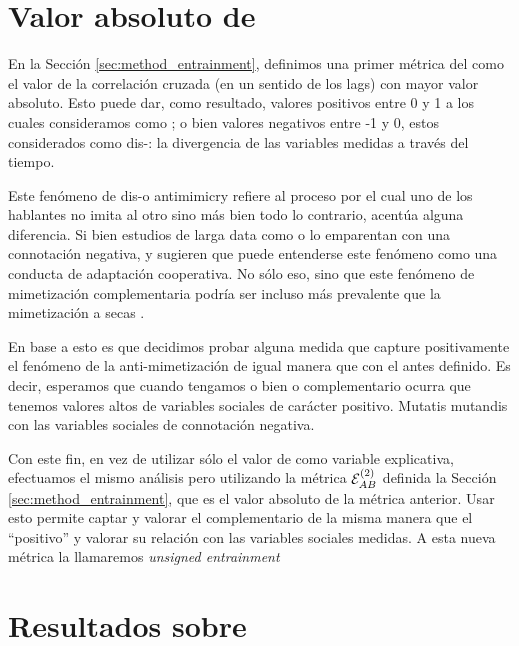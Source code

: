 

\section{Valor absoluto de \entrainment}
\label{sec:abs_entrainment}

En la Sección \ref{sec:method_entrainment}, definimos una primer métrica del \entrainment como el valor de la correlación cruzada (en un sentido de los lags) con mayor valor absoluto. Esto puede dar, como resultado, valores positivos entre 0 y 1 a los cuales consideramos como \entrainment; o bien valores negativos entre -1 y 0, estos considerados como dis-\entrainment: la divergencia de las variables \ap medidas a través del tiempo.

Este fenómeno de dis-\entrainment o antimimicry \cite{CHAR1999} refiere al proceso por el cual uno de los hablantes no imita al otro sino más bien todo lo contrario, acentúa alguna diferencia. Si bien estudios de larga data como \cite{bourhis1973language} o \cite{dabbs1969similarity} lo emparentan con una connotación negativa, \cite{healey2014divergence} y \cite{levitan2015acoustic} sugieren que puede entenderse este fenómeno como una conducta de adaptación cooperativa. No sólo eso, sino que este fenómeno de mimetización complementaria podría ser incluso más prevalente que la mimetización a secas \cite{levitan2015acoustic}.

En base a esto es que decidimos probar alguna medida que capture positivamente el fenómeno de la anti-mimetización de igual manera que con el \entrainment antes definido. Es decir, esperamos que cuando tengamos o bien \entrainment o \entrainment complementario ocurra que tenemos valores altos de variables sociales de carácter positivo. Mutatis mutandis con las variables sociales de connotación negativa.

Con este fin, en vez de utilizar sólo el valor de \entrainment como variable explicativa, efectuamos el mismo análisis pero utilizando la métrica $\mathcal{E}_{AB}^{(2)}$ definida la Sección \ref{sec:method_entrainment}, que es el valor absoluto de la métrica anterior. Usar esto permite captar y valorar el \entrainment complementario de la misma manera que el ``positivo'' y valorar su relación con las variables sociales medidas. A esta nueva métrica la llamaremos \emph{unsigned entrainment}

\section{Resultados sobre \absentrainment}

